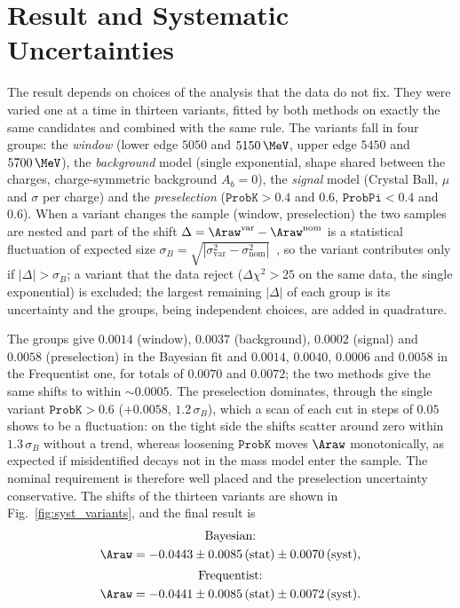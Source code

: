 \section{Result and Systematic Uncertainties}
\label{sec:syst}
The result depends on choices of the analysis that the data do not fix. They were varied one at a time in thirteen variants, fitted by both methods on exactly the same candidates and combined with the same rule. The variants fall in four groups: the \emph{window} (lower edge $5050$ and $5150\,\MeV$, upper edge $5450$ and $5700\,\MeV$), the \emph{background} model (single exponential, shape shared between the charges, charge-symmetric background $A_b=0$), the \emph{signal} model (Crystal Ball, $\mu$ and $\sigma$ per charge) and the \emph{preselection} ($\texttt{ProbK}>0.4$ and $0.6$, $\texttt{ProbPi}<0.4$ and $0.6$). When a variant changes the sample (window, preselection) the two samples are nested and part of the shift $\Delta=\Araw^{\mathrm{var}}-\Araw^{\mathrm{nom}}$ is a statistical fluctuation of expected size $\sigma_B=\sqrt{|\sigma_{\mathrm{var}}^2-\sigma_{\mathrm{nom}}^2|}$~\cite{barlow}, so the variant contributes only if $|\Delta|>\sigma_B$; a variant that the data reject ($\Delta\chi^2>25$ on the same data, the single exponential) is excluded; the largest remaining $|\Delta|$ of each group is its uncertainty and the groups, being independent choices, are added in quadrature.

The groups give $0.0014$ (window), $0.0037$ (background), $0.0002$ (signal) and $0.0058$ (preselection) in the Bayesian fit and $0.0014$, $0.0040$, $0.0006$ and $0.0058$ in the Frequentist one, for totals of $0.0070$ and $0.0072$; the two methods give the same shifts to within $\sim$$0.0005$. The preselection dominates, through the single variant $\texttt{ProbK}>0.6$ ($+0.0058$, $1.2\,\sigma_B$), which a scan of each cut in steps of $0.05$ shows to be a fluctuation: on the tight side the shifts scatter around zero within $1.3\,\sigma_B$ without a trend, whereas loosening $\texttt{ProbK}$ moves $\Araw$ monotonically, as expected if misidentified decays not in the mass model enter the sample. The nominal requirement is therefore well placed and the preselection uncertainty conservative. The shifts of the thirteen variants are shown in Fig.~\ref{fig:syst_variants}, and the final result is
\begin{gather*}
\text{Bayesian:}\\ \Araw=-0.0443\pm0.0085\,(\text{stat})\pm0.0070\,(\text{syst}),\\[2pt]
\text{Frequentist:}\\ \Araw=-0.0441\pm0.0085\,(\text{stat})\pm0.0072\,(\text{syst}).
\end{gather*}


